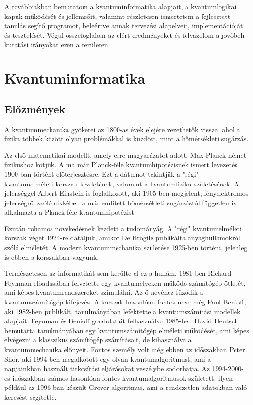 \documentclass[
]{thesis-ekf}
\theoremstyle{definition}
\theoremstyle{remark}
\begin{document}
A továbbiakban bemutatom a kvantuminformatika alapjait, a kvantumlogikai kapuk működését és jellemzőit, valamint részletesen ismertetem a fejlesztett tanulás segítő programot, beleértve annak tervezési alapelveit, implementációját és tesztelését. Végül összefoglalom az elért eredményeket és felvázolom a jövőbeli kutatási irányokat ezen a területen.

\chapter{Kvantuminformatika}
\section{Előzmények}
A kvantummechanika gyökerei az 1800-as évek elejére vezethetők vissza, ahol a fizika többek között olyan problémákkal is küzdött, mint a hőmérsékleti sugárzás.

Az első matematikai modellt, amely erre magyarázatot adott, Max Planck német fizikushoz kötjük. A ma már Planck-féle kvantumhipotézisnek ismert levezetés 1900-ban történt előterjesztésre. Ezt a dátumot tekintjük a "régi" kvantumelméleti korszak kezdetének, valamint a kvantumfizika születésének. A jelenséggel Albert Einstein is foglalkozott, aki 1905-ben megjelent, fényelektromos jelenségről szóló cikkében a már említett hőmérsékleti sugárzástól független is alkalmazta a Planck-féle kvantumhipotézist.

Ezután rohamos növekedésnek kezdett a tudományág. A "régi" kvantumelméleti korszak végét 1924-re datáljuk, amikor De Brogile publikálta anyaghullámokról szóló elméletét. A modern kvantummechanika születése 1925-ben történt, jelenleg is ebben a korszakban vagyunk.

Természetesen az informatikát sem kerülte el ez a hullám. 1981-ben Richard Feynman előadásában felvetette egy kvantumelveken működő számítógép ötletét, ami képes kvantumrendszereket szimulálni. Az ő nevéhez fűződik a kvantumszámítógép kifejezés. A korszak hasonlóan fontos neve még Paul Benioff, aki 1982-ben publikált, tanulmányában lefektette a kvantumszámítási modellek alapjait. Feynman és Benioff gondolatait felhasználva 1985-ben David Deutsch bemutatta tanulmányában egy kvantumszámítógép elméleti működését, ami képes elvégezni a klasszikus számítógép számításait, de kihasználva a kvantummechanika előnyeit. Fontos személy volt még ebben az időszakban Peter Shor, aki 1994-ben megalkotott egy olyan kvantumalgoritmust, ami a napjainkban használt titkosítási eljárásokat veszélybe sodorhatja. Az 1994-2000-es időszakban számos hasonlóan fontos kvantumalgoritmusok született. Ilyen például az 1996-ban készült Grover algoritmus, ami a rendezetlen adatokban való keresést segítette.
\end{document}
